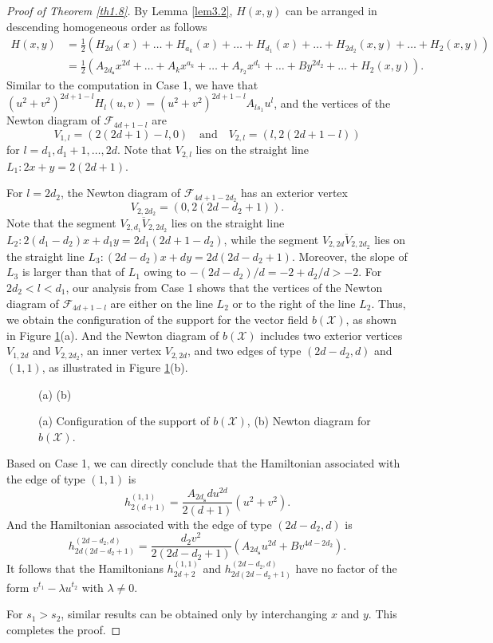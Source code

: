 \documentclass[10pt,a4paper]{amsart}
\numberwithin{equation}{section}
\begin{document}
\begin{proof}[Proof of Theorem \ref{th1.8}]
By Lemma \ref{lem3.2},  $H(x,y)$  can be arranged in descending homogeneous order as 
follows
\begin{align*}
    H(x,y)&=\frac{1}{2}\left(H_{2d}(x)\!+\!\dots\!+\!H_{a_k}(x)\!+\!\dots\!+\!H_{d_1}(x)\!+\!\dots\!+\!H_{2d_2}(x,y)\!+\!\dots\!+\!H_2(x,y)\right)\\
&=\frac{1}{2}\left(A_{2d_{\mathbf{s}}}x^{2d}+\dots+A_{k}x^{a_{k}}+\dots+A_{r_2}x^{d_1}+\dots+By^{2d_2}+\dots+H_2(x,y)\right).
\end{align*}
Similar to the computation in Case 1, we have that  
$(u^2+v^2)^{2d+1-l}H_{l}(u,v)=(u^2+v^2)^{2d+1-l}A_{ls_1}u^l$, and the vertices of the 
Newton diagram of $\mathcal{F}_{4d+1-l}$ are
\[
V_{1,l}=(2(2d+1)-l,0) \quad \text{and} \quad V_{2,l}=(l,2(2d+1-l))
\]
for $l=d_1, d_1+1, \ldots, 2d$.
Note that $V_{2,l}$ lies on the straight line $L_1:2x+y=2(2d+1)$.

For $l=2d_2$, the Newton diagram of $\mathcal{F}_{4d+1-2d_2}$ has an exterior vertex
\[
V_{2,2d_2}=(0,2(2d-d_2+1)).
\]
Note that the segment $\overline{V_{2,d_1}V_{2,2d_2}}$ lies on the straight line 
$L_2:2(d_1-d_2)x+d_1y=2d_1(2d+1-d_2)$, while the segment $\overline{V_{2,2d}V_{2,2d_2}}$ 
lies on the straight line $L_3:(2d-d_2)x+dy=2d(2d-d_2+1)$. 
Moreover, the slope of $L_3$ is larger than that of $L_1$ owing to 
$-(2d-d_2)/d=-2+d_2/d>-2$.
For $2d_2<l<d_1$, our analysis from Case 1 shows that the vertices of the Newton 
diagram of $\mathcal{F}_{4d+1-l}$ are either on the line $L_2$ or to the right of the 
line $L_2$. Thus, we obtain the configuration of the support for the vector field 
$b(\mathcal{X})$, as shown in Figure \ref{Fig3}(a).
And the Newton diagram of $b(\mathcal{X})$ includes two exterior vertices $V_{1,2d}$ 
and $V_{2,2d_2}$, an inner vertex $V_{2,2d}$, and two edges of type $(2d-d_2, d)$ 
and $(1,1)$, as illustrated in Figure \ref{Fig3}(b).

\begin{figure}[htp]
\centering
(a) \hfil (b)
\caption{(a) Configuration of the support of $b(\mathcal{X})$,
(b)  Newton diagram for $b(\mathcal{X})$.}
\label{Fig3} %
\end{figure}

Based on Case 1, we can directly conclude that the Hamiltonian associated with the 
edge of type $(1,1)$ is
\[
h_{2(d+1)}^{(1,1)}=\frac{A_{2d_{\mathbf{s}}}du^{2d}}{2(d+1)}(u^2+v^2).
\]
And the Hamiltonian associated with the edge of type $(2d-d_2, d)$ is
\[
h_{2d(2d-d_2+1)}^{(2d-d_2,d)}
=\frac{d_2v^2}{2(2d-d_2+1)}\left(A_{2d_{\mathbf{s}}}u^{2d}+Bv^{4d-2d_2}\right).
\]
It follows that the Hamiltonians $h_{2d+2}^{(1,1)}$ and $h_{2d(2d-d_2+1)}^{(2d-d_2,d)}$ 
have no factor of the form $v^{t_1}-\lambda u^{t_2}$ with $\lambda\neq 0$.

For $s_1>s_2$, similar results can be obtained only by interchanging $x$ and $y$.
This completes the proof.
\end{proof}
\end{document}
